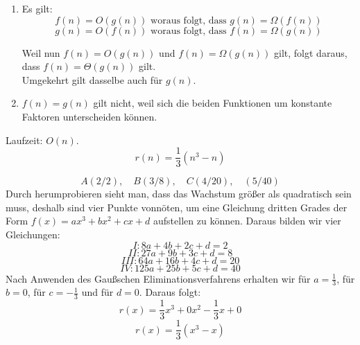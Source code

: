 \documentclass[a4paper, 12pt, margins=3cm]{homework}
\begin{document}
  \begin{problem}
    
  \end{problem}
  \begin{solution}\hfill
    \begin{enumerate}\itemsep0pt
      \item Es gilt: \[ f(n) = O(g(n))\text{ woraus folgt, dass } g(n) = \Omega(f(n)) \]
                     \[ g(n) = O(f(n))\text{ woraus folgt, dass } f(n) = \Omega(g(n)) \]

            Weil nun $f(n) = O(g(n))$ und $f(n) = \Omega(g(n))$ gilt, folgt daraus, dass
            $f(n) = \Theta(g(n))$ gilt. \\
            Umgekehrt gilt dasselbe auch für $g(n)$.

      \item $f(n) = g(n)$ gilt nicht, weil sich die beiden Funktionen um konstante
            Faktoren unterscheiden können.
    \end{enumerate}
  \end{solution}


  \begin{problem}
    
  \end{problem}
  \begin{solution}\hfill
    \begin{center}
      \def\svgwidth{0.5\textwidth}
    \end{center}
  \end{solution}

\newpage

  \begin{problem}

  \end{problem}
  \begin{solution}\hfill

        Laufzeit: $O(n)$.
        \[ r(n) = \frac{1}{3}(n^3-n) \]

        \[ A(2/2),\quad B(3/8),\quad C(4/20),\quad (5/40) \]
        Durch herumprobieren sieht man, dass das Wachstum größer als quadratisch
        sein muss, deshalb sind vier Punkte vonnöten, um eine Gleichung dritten
        Grades der Form $f(x)=ax^3+bx^2+cx+d$ aufstellen zu können. Daraus bilden
        wir vier Gleichungen:
        \[ I: 8a+4b+2c+d=2 \]
        \[ II: 27a+9b+3c+d=8 \]
        \[ III: 64a+16b+4c+d=20 \]
        \[ IV: 125a+25b+5c+d=40 \]
        Nach Anwenden des Gaußschen Eliminationsverfahrens erhalten wir für $a=\frac{1}{3}$,
        für $b=0$, für $c=-\frac{1}{3}$ und für $d=0$. Daraus folgt:
        \[ r(x) = \frac{1}{3}x^3 + 0x^2 - \frac{1}{3}x + 0 \]
        \[ r(x) = \frac{1}{3}(x^3-x) \]

  \end{solution}
\end{document}
